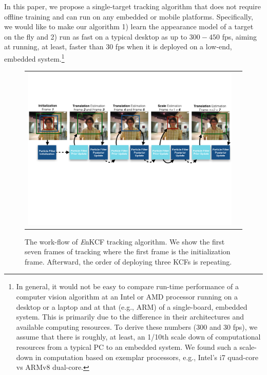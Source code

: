 \documentclass[10pt,twocolumn,letterpaper]{article}
\begin{document}
In this paper, we propose a single-target tracking algorithm that does
not require offline training and can run on any embedded or mobile
platforms. Specifically, we would like to make our algorithm 1) learn
the appearance model of a target on the fly and 2) run as fast on a
typical desktop as up to $300-450$ fps, aiming at running, at least,
faster than 30 fps when it is deployed on a low-end, embedded
system.\footnote{In general, it would not be easy to compare run-time
  performance of a computer vision algorithm at an Intel or AMD
  processor running on a desktop or a laptop and at that (e.g., ARM)
  of a single-board, embedded system. This is primarily due to the
  difference in their architectures and available computing
  resources. To derive these numbers (300 and 30 fps), we assume that
  there is roughly, at least, an 1/10th scale down of computational
  resources from a typical PC to an embedded system. We found such a
  scale-down in computation based on exemplar processors, e.g.,
  Intel's i7 quad-core vs ARMv8 dual-core.}

\begin{figure}[!h]
\centering
\begin{tabular}{cc}
\includegraphics[width=14.00cm]{./figures/Workflow_MKCF+PF.pdf}\\
\end{tabular}
\caption{The work-flow of {\it E}nKCF tracking algorithm. We show the
  first seven frames of tracking where the first frame is the
  initialization frame. Afterward, the order of deploying three KCFs
  is repeating.}
\label{Workflows}
\end{figure}
\end{document}
